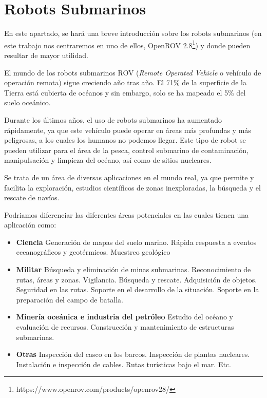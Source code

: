 \section{Robots Submarinos}
\label{cap:Robots Submarinos}
En este apartado, se hará una breve introducción sobre los robots submarinos (en este trabajo nos centraremos en uno de ellos, OpenROV 2.8\footnote{https://www.openrov.com/products/openrov28/}) y donde pueden resultar de mayor utilidad.

El mundo de los robots submarinos ROV (\textit{Remote Operated Vehicle} o vehículo de operación remota) sigue creciendo año tras año. El 71\% de la superficie de la Tierra está cubierta de océanos y sin embargo, solo se ha mapeado el 5\% del suelo oceánico.

Durante los últimos años, el uso de robots submarinos ha aumentado rápidamente, ya que este vehículo puede operar en áreas más profundas y más peligrosas, a los cuales los humanos no podemos llegar. Este tipo de robot se pueden utilizar para el área de la pesca, control submarino de contaminación, manipulsación y limpieza del océano, así como de sitios nucleares.

Se trata de un área de diversas aplicaciones en el mundo real, ya que permite y facilita la exploración, estudios científicos de zonas inexploradas, la búsqueda y el rescate de navíos.

Podriamos diferenciar las diferentes áreas potenciales en las cuales tienen una aplicación como:

  \begin{itemize}
  \item \textbf{Ciencia}
    \subitem Generación de mapas del suelo marino.
    \subitem Rápida respuesta a eventos eceanográficos y geotérmicos.
    \subitem Muestreo geológico
  \item \textbf{Militar}
   \subitem Búsqueda y eliminación de minas submarinas. 
   \subitem Reconocimiento de rutas, áreas y zonas. 
   \subitem Vigilancia. 
   \subitem Búsqueda y rescate. 
   \subitem Adquisición de objetos. 
   \subitem Seguridad en las rutas. 
   \subitem Soporte en el desarrollo de la situación. 
   \subitem Soporte en la preparación del campo de batalla. 
  \item \textbf{Minería oceánica e industria del petróleo}
    \subitem Estudio del océano y evaluación de recursos.
    \subitem Construcción y mantenimiento de estructuras submarinas.
  \item \textbf{Otras}
    \subitem Inspección del casco en los barcos.
    \subitem Inspección de plantas nucleares.
    \subitem Instalación e inspección de cables. 
    \subitem Rutas turísticas bajo el mar.
    \subitem Etc.
 \end{itemize}

